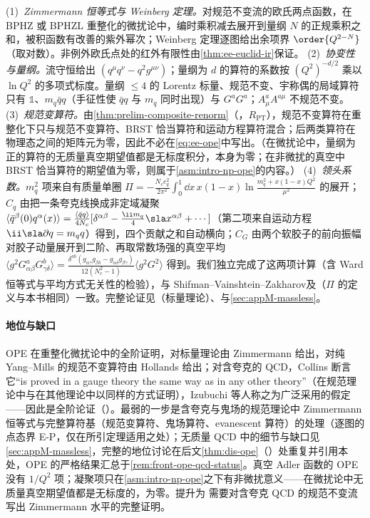 \begin{proofsketch}
(1)~\emph{Zimmermann 恒等式与 Weinberg 定理。}对规范不变流的欧氏两点函数，在 BPHZ 或 BPHZL 重整化的微扰论中，编时乘积减去展开到量纲 $N$ 的正规乘积之和，被积函数有改善的紫外幂次；Weinberg 定理逐图给出余项界 $\order{Q^{2-N}}$（取对数）。非例外欧氏点处的红外有限性由\cref{thm:ee-euclid-ir}保证。
(2)~\emph{协变性与量纲。}流守恒给出 $(q^\mu q^\nu-q^2g^{\mu\nu})$；量纲为 $d$ 的算符的系数按 $(Q^2)^{-d/2}$ 乘以 $\ln Q^2$ 的多项式标度。量纲 $\le4$ 的 Lorentz 标量、规范不变、宇称偶的局域算符只有 $\mathbb 1$、$m_q\bar qq$（手征性使 $\bar qq$ 与 $m_q$ 同时出现）与 $G^aG^a$；$A^a_\mu A^{a\mu}$ 不规范不变。
(3)~\emph{规范变算符。}由\cref{thm:prelim-composite-renorm}（\tagR，$R_{\mathrm{PT}}$），规范不变算符在重整化下只与规范不变算符、BRST 恰当算符和运动方程算符混合；后两类算符在物理态之间的矩阵元为零，因此不必在\cref{eq:ee-ope}中写出。（在微扰论中，量纲为正的算符的无质量真空期望值都是无标度积分，本身为零；在非微扰的真空中 BRST 恰当算符的期望值为零，则属于\cref{asm:intro-np-ope}的内容。）
(4)~\emph{领头系数。}$m_q^2$ 项来自有质量单圈 $\Pi=-\frac{N_ce_q^2}{2\pi^2}\int_0^1\dd x\,x(1-x)\ln\frac{m_q^2+x(1-x)Q^2}{\mu^2}$ 的展开；$C_q$ 由把一条夸克线换成非定域凝聚 $\langle\bar q^\beta(0)q^\alpha(x)\rangle=\frac{\langle\bar qq\rangle}{4N_c}[\delta^{\alpha\beta}-\frac{\ii m_q}4\sla x^{\alpha\beta}+\cdots]$（第二项来自运动方程 $\ii\sla\partial q=m_qq$）得到，四个贡献之和自动横向；$C_G$ 由两个软胶子的前向振幅对胶子动量展开到二阶、再取常数场强的真空平均 $\langle g^2G^a_{\alpha\beta}G^b_{\gamma\delta}\rangle=\frac{\delta^{ab}(g_{\alpha\gamma}g_{\beta\delta}-g_{\alpha\delta}g_{\beta\gamma})}{12(N_c^2-1)}\langle g^2G^2\rangle$ 得到。我们独立完成了这两项计算（含 Ward 恒等式与平均方式无关性的检验），与 Shifman--Vainshtein--Zakharov\cite{ShifmanVainshteinZakharov1979a,ShifmanVainshteinZakharov1979b}及\cite[式~(45)]{Colangelo:2000dp}（$\Pi$ 的定义与本书相同）一致。完整论证见\cite{Zimmermann1973}（标量理论）、\cite[第~12.8~节]{Collins1984}与\cref{sec:appM-massless}。
\end{proofsketch}

\paragraph{地位与缺口}OPE 在重整化微扰论中的全阶证明，对标量理论由 Zimmermann 给出\cite{Zimmermann1973}，对纯 Yang--Mills 的规范不变算符由 Hollands 给出\cite{Hollands:2007zg}；对含夸克的 QCD，Collins 断言它“is proved in a gauge theory the same way as in any other theory”\cite[第~12.8~节]{Collins1984}（在规范理论中与在其他理论中以同样的方式证明），Izubuchi 等人称之为广泛采用的假定\cite[第~II~节]{IzubuchiEtAl2018}——因此是全阶论证（\tagA）。最弱的一步是含夸克与鬼场的规范理论中 Zimmermann 恒等式与完整算符基（规范变算符、鬼场算符、evanescent 算符）的处理（逐图的点态界 E-P，仅在所引定理适用之处）；无质量 QCD 中的细节与缺口见\cref{sec:appM-massless}，完整的地位讨论在后文\cref{thm:dis-ope}（\tagA）处重复并引用本处，OPE 的严格结果汇总于\cref{rem:front-ope-qcd-status}。真空 Adler 函数的 OPE 没有 $1/Q^2$ 项；凝聚项只在\cref{asm:intro-np-ope}之下有非微扰意义——在微扰论中无质量真空期望值都是无标度的，为零。提升为 \tagR 需要对含夸克 QCD 的规范不变流写出 Zimmermann 水平的完整证明。

